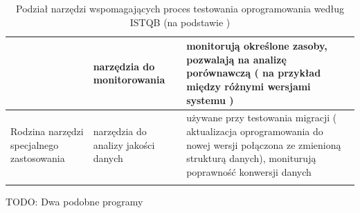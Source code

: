 \begin{longtable}{| p{4cm} | p{4cm} | p{8cm} |}
& narzędzia do monitorowania & monitorują określone zasoby, pozwalają na analizę porównawczą ( na przykład między różnymi wersjami systemu ) \\ \hline
\hline
\multirow{1}{4cm}{Rodzina narzędzi specjalnego zastosowania} &
narzędzia do analizy jakości danych & używane przy testowania migracji ( aktualizacja oprogramowania do nowej wersji połączona ze zmienioną strukturą danych), moniturują poprawność konwersji danych \\
\hline
\caption{Podział narzędzi wspomagających proces testowania oprogramowania według ISTQB (na podstawie  \cite{istqb})}\\
\end{longtable}

TODO: Dwa podobne programy











